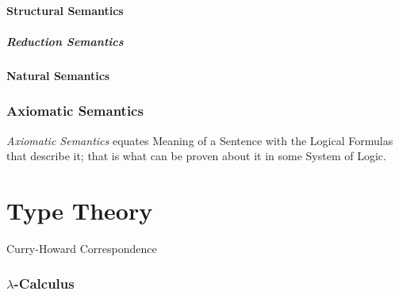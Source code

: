 \documentclass{article}
\begin{document}
\subsection{Structural Semantics}

\subsubsection{Reduction Semantics}

\subsection{Natural Semantics}

\section{Axiomatic Semantics}

\emph{Axiomatic Semantics} equates Meaning of a Sentence with the
Logical Formulas that describe it; that is what can be proven about it
in some System of Logic.

\part{Type Theory}

Curry-Howard Correspondence

\section{$\lambda$-Calculus}\label{sec:lambda_calculus}

\end{document}
